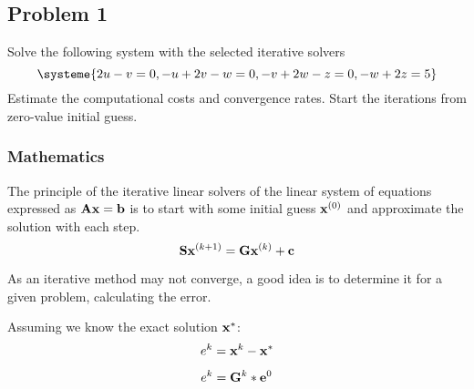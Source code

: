 \subsection{Problem 1}%
\label{sec:problem_1}
Solve the following system with the selected iterative solvers
\begin{equation*}
  \systeme{2u-v=0,-u+2v-w=0,-v+2w-z=0,-w+2z=5}
\end{equation*}
Estimate the computational costs and convergence rates.
Start the iterations from zero-value initial guess.
\subsubsection*{Mathematics}
The principle of the iterative linear solvers of the linear system of equations
expressed as $\mathbf{A}\mathbf{x}=\mathbf{b}$ is to start with some initial guess
$\mathbf{x}^{(0)}$ and approximate the solution with each step.
\begin{equation*}
  \mathbf{S}\mathbf{}
  \mathbf{x}^{(k+1)} = \mathbf{G}\mathbf{x}^{(k)} + \mathbf{c}
\end{equation*}

As an iterative method may not converge, a good idea is to determine it for a given problem, calculating the error.

Assuming we know the exact solution $\mathbf{x}^*$:
\begin{equation*}
  e^k = \mathbf{x}^k - \mathbf{x}^*
\end{equation*}

\begin{equation*}
  e^k = \mathbf{G}^k * \mathbf{e}^0
\end{equation*}

